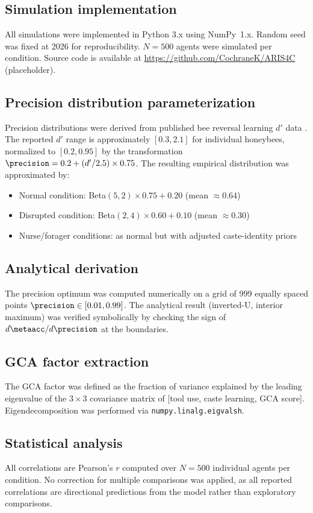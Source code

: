 \subsection*{Simulation implementation}
\label{sec:methods:sim}

All simulations were implemented in Python 3.x using NumPy~1.x. Random seed was fixed at 2026
for reproducibility. $N = 500$ agents were simulated per condition. Source code is available at
\url{https://github.com/CochraneK/ARIS4C} (placeholder).

\subsection*{Precision distribution parameterization}
\label{sec:methods:params}

Precision distributions were derived from published bee reversal learning $d'$ data
\cite{AvarWeber2012}. The reported $d'$ range is approximately $[0.3, 2.1]$ for individual
honeybees, normalized to $[0.2, 0.95]$ by the transformation
$\precision = 0.2 + (d'/2.5) \times 0.75$.
The resulting empirical distribution was approximated by:
\begin{itemize}
  \item Normal condition: Beta$(5, 2) \times 0.75 + 0.20$ (mean $\approx 0.64$)
  \item Disrupted condition: Beta$(2, 4) \times 0.60 + 0.10$ (mean $\approx 0.30$)
  \item Nurse/forager conditions: as normal but with adjusted caste-identity priors
\end{itemize}

\subsection*{Analytical derivation}
\label{sec:methods:deriv}

The precision optimum was computed numerically on a grid of 999 equally spaced points
$\precision \in [0.01, 0.99]$. The analytical result (inverted-U, interior maximum) was
verified symbolically by checking the sign of $d\metaacc/d\precision$ at the boundaries.

\subsection*{GCA factor extraction}
\label{sec:methods:gca}

The GCA factor was defined as the fraction of variance explained by the leading eigenvalue of the
$3 \times 3$ covariance matrix of [tool use, caste learning, GCA score]. Eigendecomposition was
performed via \texttt{numpy.linalg.eigvalsh}.

\subsection*{Statistical analysis}
\label{sec:methods:stats}

All correlations are Pearson's $r$ computed over $N = 500$ individual agents per condition.
No correction for multiple comparisons was applied, as all reported correlations are directional
predictions from the model rather than exploratory comparisons.
